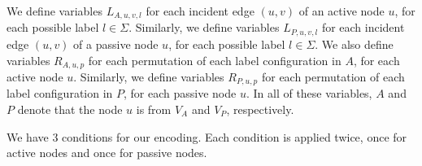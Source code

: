 We define variables $L_{A,u,v,l}$ for each incident edge $(u, v)$ of an active node $u$, for each possible label $l \in \Sigma$.
Similarly, we define variables $L_{P,u,v,l}$ for each incident edge $(u, v)$ of a passive node $u$, for each possible label $l \in \Sigma$.
We also define variables $R_{A, u, p}$ for each permutation of each label configuration in $A$, for each active node $u$.
Similarly, we define variables $R_{P, u, p}$ for each permutation of each label configuration in $P$, for each passive node $u$.
In all of these variables, $A$ and $P$ denote that the node $u$ is from $V_A$ and $V_P$, respectively.

\renewcommand{\labelenumi}{\arabic{enumi}.}
\renewcommand{\labelenumii}{\arabic{enumi}\alph{enumii}.}
We have 3 conditions for our encoding.
Each condition is applied twice, once for active nodes and once for passive nodes.
